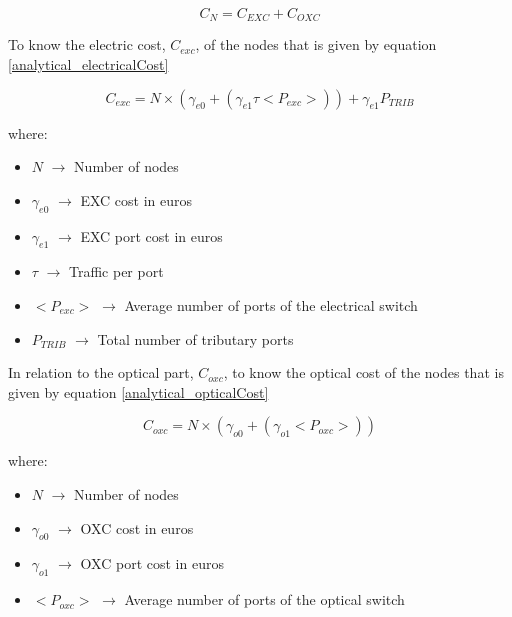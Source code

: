 \begin{equation}
C_N = C_{EXC} + C_{OXC}
\label{analytical_Capex_Node}
\end{equation}

\vspace{11pt}
To know the electric cost, $C_{exc}$, of the nodes that is given by equation \ref{analytical_electricalCost}

\begin{equation}
C_{exc} = N \times \left( \gamma_{e0} + \left( \gamma_{e1} \tau <P_{exc}> \right) \right) + \gamma_{e1} P_{TRIB}
\label{analytical_electricalCost}
\end{equation}

\vspace{11pt}
\noindent
where:
\begin{itemize}
\item{$N$			$\rightarrow$	Number of nodes}
\item{$\gamma_{e0}$	$\rightarrow$	EXC cost in euros}
\item{$\gamma_{e1}$	$\rightarrow$	EXC port cost in euros}
\item{$\tau$		$\rightarrow$	Traffic per port}
\item{$<P_{exc}>$   $\rightarrow$   Average number of ports of the electrical switch}
\item{$P_{TRIB}$    $\rightarrow$   Total number of tributary ports}
\end{itemize}

\vspace{11pt}
In relation to the optical part, $C_{oxc}$, to know the optical cost of the nodes that is given by equation \ref{analytical_opticalCost}

\begin{equation}
C_{oxc} = N \times \left( \gamma_{o0} + \left( \gamma_{o1} <P_{oxc}> \right) \right)
\label{analytical_opticalCost}
\end{equation}

\vspace{11pt}
\noindent
where:
\begin{itemize}
\item{$N$			$\rightarrow$	Number of nodes}
\item{$\gamma_{o0}$	$\rightarrow$	OXC cost in euros}
\item{$\gamma_{o1}$	$\rightarrow$	OXC port cost in euros}
\item{$<P_{oxc}>$   $\rightarrow$   Average number of ports of the optical switch}
\end{itemize}

